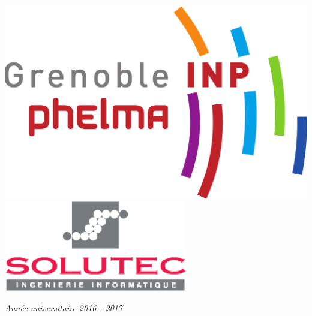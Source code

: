\begin{titlepage}
	\parbox{\textwidth}{
		\includegraphics[height = 0.1\textheight]{images/logo_phelma.png}
		\includegraphics[height = 0.1\textheight]{images/logo_solutec.png}
	}

	\center\textsl{Année universitaire 2016 - 2017}

\end{titlepage}

